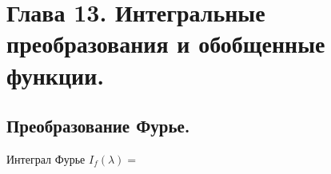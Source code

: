 \section{Глава 13. Интегральные преобразования и обобщенные функции.}
\subsection{Преобразование Фурье.}
Интеграл Фурье $I_f(\lambda)=$

























